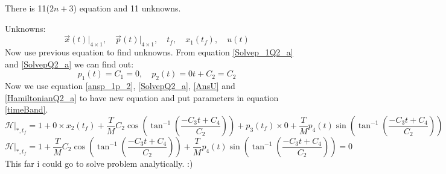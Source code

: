 There is 11($2n+3$)  equation and 11 unknowns.



Unknowns:
$$\vec{x}(t)\vert_{4\times 1}, \quad \vec{p}(t)\vert_{4\times 1},\quad t_f, \quad x_1(t_f),\quad u(t)$$
Now use previous equation to find unknowns.
From equation \ref{Solvep_1Q2_a} and \ref{SolvepQ2_a} we can find out:
\begin{equation}\label{ansp_1p_2}
	p_1(t) = C_1 = 0, \quad p_2(t) = 0t + C_2 = C_2
\end{equation}
Now we use equation \ref{ansp_1p_2}, \ref{SolvepQ2_a}, \ref{AnsU} and \ref{HamiltonianQ2_a} to have new equation and put parameters in equation  \ref{timeBand}. 
\begin{equation*}
	\left.\mathcal{H}\right\vert_{*, t_f}  = 1 + 0\times x_2(t_f) + \dfrac{T}{M}C_2\cos\left(\tan^{-1}\left(\dfrac{-C_3t+C_4}{C_2}\right)\right) +p_3(t_f) \times 0 +\dfrac{T}{M}p_4(t)\sin\left(\tan^{-1}\left(\dfrac{-C_3t+C_4}{C_2}\right)\right)
\end{equation*}
\begin{equation}\label{finalHamiltonian}
		\left.\mathcal{H}\right\vert_{*, t_f}  = 1  + \dfrac{T}{M}C_2\cos\left(\tan^{-1}\left(\dfrac{-C_3t+C_4}{C_2}\right)\right) +\dfrac{T}{M}p_4(t)\sin\left(\tan^{-1}\left(\dfrac{-C_3t+C_4}{C_2}\right)\right) = 0
\end{equation}
This far i could go to solve problem analytically. :)


